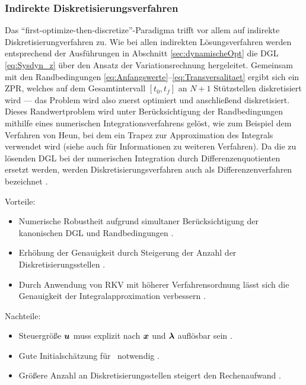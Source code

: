 \subsubsection{Indirekte Diskretisierungsverfahren}\label{subsubsec:Diskretisierungsverfahren_indirekt}
Das ``first-optimize-then-discretize''-Paradigma trifft vor allem auf indirekte Diskretisierungverfahren zu. Wie bei allen indirekten Lösungsverfahren werden entsprechend der Ausführungen in Abschnitt \ref{sec:dynamischeOpt} die \gls{DGL} \eqref{eq:Sysdyn_z} über den Ansatz der Variationsrechnung hergeleitet. Gemeinsam mit den Randbedingungen \eqref{eq:Anfangswerte}--\eqref{eq:Transversalitaet} ergibt sich ein \gls{ZPR}, welches auf dem Gesamtintervall $[t_0, t_f]$ an $N+1$ Stützstellen diskretisiert wird \cite{KnutGraichen.2012} --- das Problem wird also zuerst optimiert und anschließend diskretisiert. Dieses Randwertproblem wird unter Berücksichtigung der Randbedingungen mithilfe eines numerischen Integrationsverfahrens gelöst, wie zum Beispiel dem Verfahren von Heun, bei dem ein Trapez zur Approximation des Integrals verwendet wird \cite{KnutGraichen.2012} (siehe auch \cite{Adamy.2009} für Informationen zu weiteren Verfahren). Da die zu lösenden \gls{DGL} bei der numerischen Integration durch Differenzenquotienten ersetzt werden, werden Diskretisierungsverfahren auch als Differenzenverfahren bezeichnet \cite{Ascher.1995c5}.
\begin{multicols}{2}
Vorteile:
	\begin{itemize}
		\item Numerische Robustheit aufgrund simultaner Berücksichtigung der kanonischen \gls{DGL} und Randbedingungen \cite{KnutGraichen.2012}.
		\item Erhöhung der Genauigkeit durch Steigerung der Anzahl der Diskretisierungsstellen \cite{KnutGraichen.2012}.
		\item Durch Anwendung von \gls{RKV} mit höherer Verfahrensordnung lässt sich die Genauigkeit der Integralapproximation verbessern \cite{Ascher.1995c5}.
	\end{itemize}
	
	\columnbreak
	
Nachteile:
	\begin{itemize}
		\item Steuergröße $\boldsymbol{u}$ muss explizit nach $\boldsymbol{x}$ und $\boldsymbol{\lambda}$ auflösbar sein \cite{KnutGraichen.2012}.\vspace{\fill}
		\item Gute Initialschätzung für \lambdaoftzero~notwendig \cite{KnutGraichen.2012}.\vspace{\fill}
		\item Größere Anzahl an Diskretisierungsstellen steigert den Rechenaufwand \cite{KnutGraichen.2012}.\vspace{\fill}
	\end{itemize}
\end{multicols}

